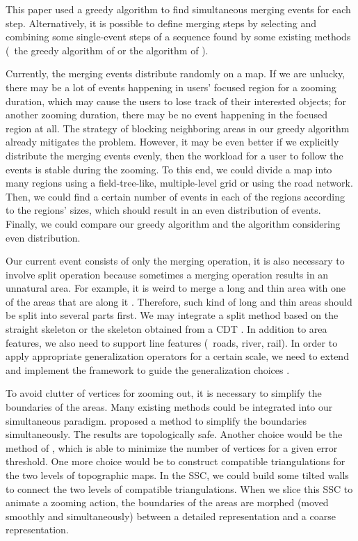 \documentclass[twocolumn]{svjour3}          %
\begin{document}
This paper used a greedy algorithm 
to find simultaneous merging events for each step.
Alternatively, it is possible to define merging steps 
by selecting and combining some single-event steps of a sequence found 
by some existing methods
(\eg~the greedy algorithm of \citet{vanOosterom2005}
or the \Astar algorithm of \citet{Peng2020AreaAgg}).

Currently, the merging events distribute randomly on a map.
If we are unlucky, there may be a lot of events 
happening in users' focused region for a zooming duration,
which may cause the users to lose track of their interested objects;
for another zooming duration, 
there may be no event happening in the focused region at all.
The strategy of blocking neighboring areas in our greedy algorithm 
already mitigates the problem.
However, it may be even better if 
we explicitly distribute the merging events evenly, 
then the workload for a user to follow the events is stable during the zooming.
To this end, we could divide a map into many regions 
using a field-tree-like, multiple-level grid \citep{vanPutten1998NewGAP}
or using the road network.
Then, we could find a certain number of events in each of the regions 
according to the regions' sizes,
which should result in an even distribution of events.
Finally, we could compare our greedy algorithm and 
the algorithm considering even distribution.

Our current event consists of only the merging operation,
it is also necessary to involve split operation
because sometimes a merging operation results in an unnatural area.
For example, it is weird to merge a long and thin area 
with one of the areas that are along it
\citep[see][]{Haunert2008Skeleton}.
Therefore, such kind of long and thin areas should be
split into several parts first.
We may integrate a split method based on the straight skeleton
\citep{Haunert2008Skeleton}
or the skeleton obtained from a CDT
\citep{Ai2002GAP,Meijers2016Split}.
In addition to area features, we also need to support line features 
(\eg~roads, river, rail).
In order to apply appropriate generalization operators
for a certain scale,
we need to extend and implement the framework 
to guide the generalization choices
\citep{Meijers2018Framework}.


To avoid clutter of vertices for zooming out, 
it is necessary to simplify the boundaries of the areas.
Many existing methods could be integrated into our simultaneous paradigm.
\citet{Meijers2011LineSimp} proposed a method 
to simplify the boundaries simultaneously. 
The results are topologically safe. 
Another choice would be the method of \citet{ImaiIri1988},
which is able to minimize the number of vertices 
for a given error threshold.
One more choice would be to construct compatible triangulations 
\citep[see][]{Peng2019Thesis}
for the two levels of topographic maps.
In the SSC, we could build some tilted walls 
to connect the two levels of compatible triangulations.
When we slice this SSC to animate a zooming action,
the boundaries of the areas are morphed 
(moved smoothly and simultaneously)
between a detailed representation and a coarse representation.
\end{document}

